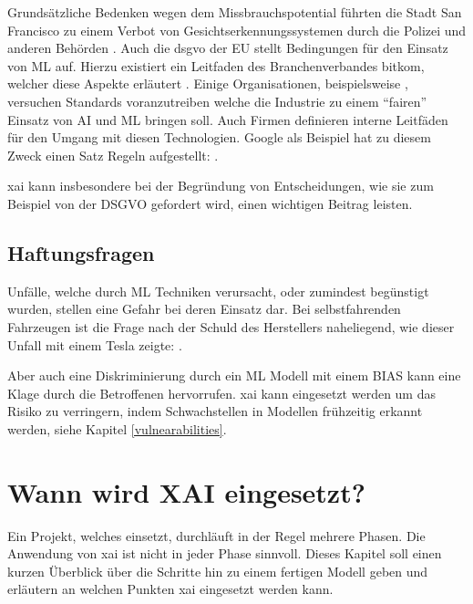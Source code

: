 \documentclass[
  12pt, %
  a4paper, %
  oneside, %
  openany, 
  numbers=noenddot, %
  BCOR=5mm, %
  parskip=half*, %
  thesis, %
]{bfhbook}
\begin{document}
Grundsätzliche Bedenken wegen dem Missbrauchspotential  führten die Stadt San Francisco zu einem Verbot von Gesichtserkennungssystemen durch die Polizei und anderen Behörden \cite{nyTimes}. Auch die \Gls{dsgvo} der EU stellt Bedingungen für den Einsatz von \Gls{ML} auf. Hierzu existiert ein Leitfaden des Branchenverbandes bitkom, welcher diese Aspekte erläutert \cite{bitkom}.
Einige Organisationen, beispielsweise \parencite{openAi}, versuchen Standards voranzutreiben welche die Industrie zu einem ``fairen'' Einsatz von \Gls{AI} und \Gls{ML} bringen soll. Auch Firmen definieren interne Leitfäden für den Umgang mit diesen Technologien. Google als Beispiel  hat zu diesem Zweck einen Satz Regeln aufgestellt: \parencite{aiGoogle}.

\Gls{xai} kann insbesondere bei der Begründung von Entscheidungen, wie sie zum Beispiel von der \acrshort{DSGVO} gefordert wird, einen wichtigen Beitrag leisten.

\section{Haftungsfragen}
Unfälle, welche durch \gls{ML} Techniken verursacht, oder zumindest begünstigt wurden, stellen eine Gefahr bei deren Einsatz dar. Bei selbstfahrenden Fahrzeugen ist die Frage nach der Schuld des Herstellers naheliegend, wie dieser Unfall mit einem Tesla zeigte: \parencite{teslaCrash}. 

Aber auch eine Diskriminierung durch ein \Gls{ML} Modell mit einem \Gls{BIAS} kann eine Klage durch die Betroffenen hervorrufen. \Gls{xai} kann eingesetzt werden um das Risiko zu verringern, indem Schwachstellen in Modellen frühzeitig erkannt werden, siehe Kapitel \ref{vulnearabilities}. 

\chapter{Wann wird XAI eingesetzt?}
Ein Projekt, welches  einsetzt, durchläuft in der Regel mehrere Phasen. Die Anwendung von \Gls{xai} ist nicht in jeder Phase sinnvoll. Dieses Kapitel soll einen kurzen Überblick über die Schritte hin zu einem fertigen Modell geben und erläutern an welchen Punkten \Gls{xai} eingesetzt werden kann.
\end{document}

